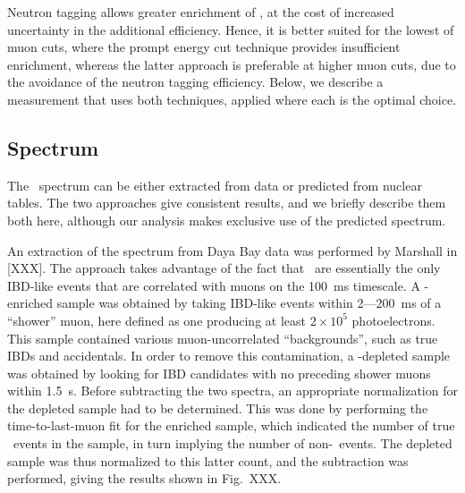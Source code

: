 \documentclass[../thesis.tex]{subfiles}
\begin{document}
Neutron tagging allows greater enrichment of \linine, at the cost of increased
uncertainty in the additional efficiency. Hence, it is better suited for the
lowest of muon cuts, where the prompt energy cut technique provides insufficient
enrichment, whereas the latter approach is preferable at higher muon cuts, due
to the avoidance of the neutron tagging efficiency. Below, we describe a
measurement that uses both techniques, applied where each is the optimal choice.

\subsection{Spectrum}
\label{sec:bkgLi9Spectrum}

The \LiHe\ spectrum can be either extracted from data or predicted from nuclear
tables. The two approaches give consistent results, and we briefly describe them
both here, although our analysis makes exclusive use of the predicted spectrum.

An extraction of the spectrum from Daya Bay data was performed by Marshall in
[XXX]. The approach takes advantage of the fact that \LiHe\ are essentially the
only IBD-like events that are correlated with muons on the 100~ms timescale. A
\LiHe-enriched sample was obtained by taking IBD-like events within 2---200~ms
of a ``shower'' muon, here defined as one producing at least $2\times10^5$
photoelectrons. This sample contained various muon-uncorrelated ``backgrounds'',
such as true IBDs and accidentals. In order to remove this contamination, a
\LiHe-depleted sample was obtained by looking for IBD candidates with no
preceding shower muons within 1.5~s. Before subtracting the two spectra, an
appropriate normalization for the depleted sample had to be determined. This was
done by performing the time-to-last-muon fit for the enriched sample, which
indicated the number of true \LiHe\ events in the sample, in turn implying the
number of non-\LiHe\ events. The depleted sample was thus normalized to this
latter count, and the subtraction was performed, giving the results shown in
Fig.~XXX.
\end{document}
